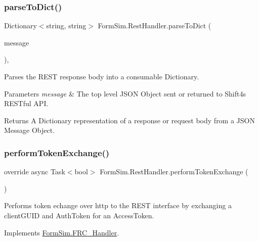 \subsubsection{\texorpdfstring{parse\+To\+Dict()}{parseToDict()}}
{\footnotesize\ttfamily Dictionary$<$string, string$>$ Form\+Sim.\+Rest\+Handler.\+parse\+To\+Dict (\begin{DoxyParamCaption}\item[{J\+S\+O\+N\+Converter.\+Message}]{message }\end{DoxyParamCaption})\hspace{0.3cm}{\ttfamily [inline]}, {\ttfamily [private]}}



Parses the R\+E\+ST response body into a consumable Dictionary. 


\begin{DoxyParams}{Parameters}
{\em message} & The top level J\+S\+ON Object sent or returned to Shift4\textquotesingle{}s R\+E\+S\+Tful A\+PI.\\
\hline
\end{DoxyParams}
\begin{DoxyReturn}{Returns}
A Dictionary representation of a response or request body from a J\+S\+ON Message Object.
\end{DoxyReturn}
\mbox{\label{class_form_sim_1_1_rest_handler_abd5c425be2b6c9e30ca3cfc0fb696aa9}} 
\subsubsection{\texorpdfstring{perform\+Token\+Exchange()}{performTokenExchange()}}
{\footnotesize\ttfamily override async Task$<$bool$>$ Form\+Sim.\+Rest\+Handler.\+perform\+Token\+Exchange (\begin{DoxyParamCaption}{ }\end{DoxyParamCaption})\hspace{0.3cm}{\ttfamily [inline]}}



Performs token echange over http to the R\+E\+ST interface by exchanging a client\+G\+U\+ID and Auth\+Token for an Access\+Token. 



Implements \mbox{\hyperlink{interface_form_sim_1_1_f_r_c___handler_a32c299d3cb3cdd6c444e76b3671af1b4}{Form\+Sim.\+F\+R\+C\+\_\+\+Handler}}.

